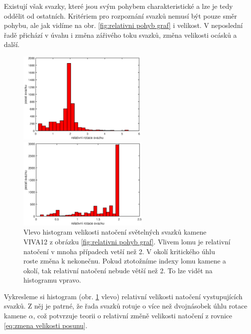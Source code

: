 Existují však svazky, které jsou svým pohybem charakteristické a lze je tedy oddělit od ostatních. Kritériem pro rozpoznání svazků nemusí být pouze směr pohybu, ale jak vidíme na obr. \ref{fig:relativni pohyb graf} i velikost. V neposlední řadě přichází v úvahu i změna zářivého toku svazků, změna velikosti ocásků a další. 

\begin{figure}[h!]
 \begin{center}
 

   \begin{minipage}[c]{0.45\textwidth}
     \centering \includegraphics[height =4.5cm]{figures/relative.eps} 
   \end{minipage}
   \begin{minipage}[c]{0.45\textwidth}
     \centering \includegraphics[height =4.5cm]{figures/relative_index1.eps} 
   \end{minipage}
 \end{center}
\caption{Vlevo histogram velikosti natočení světelných svazků kamene VIVA12 z obrázku \ref{fig:relativni pohyb graf}. Vlivem lomu je relativní natočení v mnoha případech vetší než 2. V okolí kritického úhlu roste změna k nekonečnu. Pokud ztotožníme indexy lomu kamene a okolí, tak relativní natočení nebude větší než 2. To lze vidět na histogramu vpravo.}

\label{fig:histogram relativni pohyb }

\end{figure}

Vykresleme si histogram (obr. \ref{fig:histogram relativni pohyb } vlevo) relativní velikosti natočení vystupujících svazků. Z něj je patrné, že řada svazků rotuje o více než dvojnásobek úhlu rotace kamene $\alpha$, což potvrzuje teorii o relativní změně velikosti natočení z rovnice \ref{eq:zmena velikosti posunu}. 



